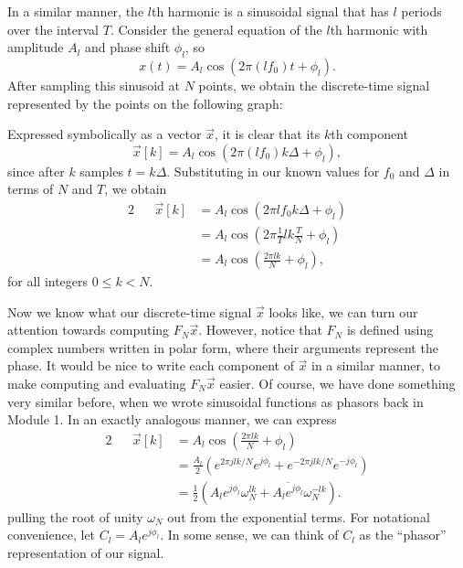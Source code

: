 \documentclass[letterpaper]{article}
\theoremstyle{remark}
\newcommand{\eqn}[1]{\begin{alignat*}{2}#1\end{alignat*}}
\begin{document}
In a similar manner, the $l$th harmonic is a sinusoidal signal that has $l$ periods over the interval $T$. Consider the general equation of the $l$th harmonic with amplitude $A_l$ and phase shift $\phi_l$, so
\[
    x(t) = A_l\cos(2\pi (lf_0) t + \phi_l).
\]
After sampling this sinusoid at $N$ points, we obtain the discrete-time signal represented by the points on the following graph:
\begin{center}
\end{center}
Expressed symbolically as a vector $\vec{x}$, it is clear that its $k$th component
\[
    \vec{x}[k] = A_l\cos(2\pi (lf_0) k\Delta + \phi_l),
\]
since after $k$ samples $t = k\Delta$. Substituting in our known values for $f_0$ and $\Delta$ in terms of $N$ and $T$, we obtain
\eqn{
    && \vec{x}[k] &= A_l\cos(2\pi lf_0 k\Delta + \phi_l) \\
    &&&= A_l\cos(2\pi \frac{1}{T} lk \frac{T}{N} + \phi_l) \\
    &&&= A_l\cos(\frac{2\pi lk}{N} + \phi_l),
}
for all integers $0 \le k < N$.

Now we know what our discrete-time signal $\vec{x}$ looks like, we can turn our attention towards computing $F_N\vec{x}$. However, notice that $F_N$ is defined using complex numbers written in polar form, where their arguments represent the phase. It would be nice to write each component of $\vec{x}$ in a similar manner, to make computing and evaluating $F_N\vec{x}$ easier. Of course, we have done something very similar before, when we wrote sinusoidal functions as phasors back in Module 1. In an exactly analogous manner, we can express
\eqn{
    && \vec{x}[k] &= A_l\cos(\frac{2\pi lk}{N} + \phi_l) \\
    &&&= \frac{A_l}{2} \left( e^{2\pi jlk / N} e^{j\phi_l} + e^{-2\pi j lk / N} e^{-j\phi_l} \right) \\
    &&&= \frac{1}{2} (A_le^{j\phi_l}\omega_N^{lk} + \overline{A_le^{j\phi_l}}\omega_N^{-lk} ).
}
pulling the root of unity $\omega_N$ out from the exponential terms. For notational convenience, let $C_l = A_le^{j\phi_l}$. In some sense, we can think of $C_l$ as the ``phasor'' representation of our signal.
\end{document}
